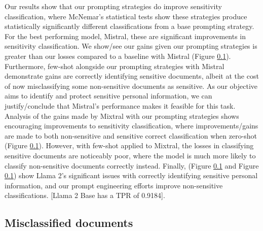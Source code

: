 Our results show that our prompting strategies do improve sensitivity classification, where McNemar’s statistical tests show these strategies produce statistically significantly different classifications from a base prompting strategy. For the best performing model, Mistral, these are significant improvements in sensitivity classification. We show/see our gains given our prompting strategies is greater than our losses compared to a baseline with Mistral (Figure \ref{}). Furthermore, few-shot alongside our prompting strategies with Mistral demonstrate gains are correctly identifying sensitive documents, albeit at the cost of now misclassifying some non-sensitive documents as sensitive. As our objective aims to identify and protect sensitive personal information, we can justify/conclude that Mistral’s performance makes it feasible for this task. Analysis of the gains made by Mixtral with our prompting strategies shows encouraging improvements to sensitivity classification, where improvements/gains are made to both non-sensitive and sensitive correct classification when zero-shot (Figure \ref{}). However, with few-shot applied to Mixtral, the losses in classifying sensitive documents are noticeably poor, where the model is much more likely to classify non-sensitive documents correctly instead. Finally, (Figure \ref{} and Figure \ref{}) show Llama 2’s significant issues with correctly identifying sensitive personal information, and our prompt engineering efforts improve non-sensitive classifications. [Llama 2 Base has a TPR of 0.9184]. 

\subsection{Misclassified documents} 

